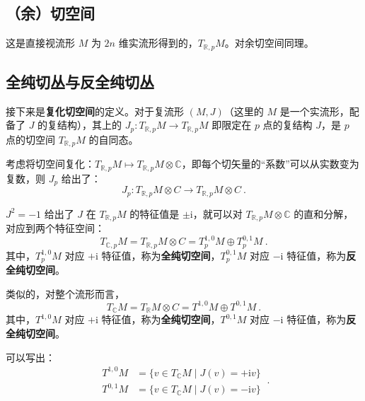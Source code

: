 

\subsection{（余）切空间}
这是直接视流形 $M$ 为 $2n$ 维实流形得到的，$T_{\mathbb R, p} M$。对余切空间同理。

\subsection{全纯切丛与反全纯切丛}
接下来是\textbf{复化切空间}的定义。对于复流形 $(M, J)$（这里的 $M$ 是一个实流形，配备了 $J$ 的复结构），其上的 $J_p: T_{\mathbb R,p} M \to T_{\mathbb R, p} M$ 即限定在 $p$ 点的复结构 $J$，是 $p$ 点的切空间 $T_{\mathbb R, p} M$ 的自同态。

考虑将切空间复化：$T_{\mathbb R, p} M \mapsto T_{\mathbb R, p} M \otimes \mathbb C$，即每个切矢量的“系数”可以从实数变为复数，则 $J_p$ 给出了：
\begin{equation}
J_p : T_{\mathbb R,p} M \otimes C \to T_{\mathbb R, p} M \otimes C ~.
\end{equation}

$J^2 = -1$ 给出了 $J$ 在 $T_{\mathbb R, p} M$ 的特征值是 $\pm \mathrm i$，就可以对 $T_{\mathbb R, p} M \otimes \mathbb C$ 的直和分解，对应到两个特征空间：
\begin{equation}
T_{\mathbb C, p} M = T_{\mathbb R, p} M \otimes C = T_p^{1, 0} M \oplus T_p^{0, 1} M ~.
\end{equation}
其中，$T_p^{1, 0} M$ 对应 $+\mathrm i$ 特征值，称为\textbf{全纯切空间}，$T_p^{0, 1} M$ 对应 $-\mathrm i$ 特征值，称为\textbf{反全纯切空间}。


类似的，对整个流形而言，
\begin{equation}
T_{\mathbb C} M = T_\mathbb R M \otimes C = T^{1, 0} M \oplus T^{0, 1} M ~.
\end{equation}
其中，$T^{1, 0} M$ 对应 $+\mathrm i$ 特征值，称为\textbf{全纯切空间}，$T^{0, 1} M$ 对应 $-\mathrm i$ 特征值，称为\textbf{反全纯切空间}。

可以写出：
\begin{equation}
\begin{aligned}
T^{1, 0} M &= \{v \in T_{\mathbb C} M \mid J(v) = +\mathrm i v\} \\
T^{0, 1} M &= \{v \in T_{\mathbb C} M \mid J(v) = -\mathrm i v\} 
\end{aligned} ~.
\end{equation}

